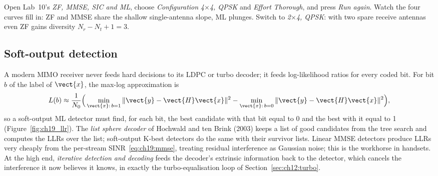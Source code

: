 \begin{tryit}
Open Lab~10's \emph{ZF, MMSE, SIC and ML}, choose \emph{Configuration} \emph{4$\times$4, QPSK} and
\emph{Effort} \emph{Thorough}, and press \emph{Run again}. Watch the four curves fill in: ZF and MMSE
share the shallow single-antenna slope, ML plunges. Switch to \emph{2$\times$4, QPSK}: with two spare
receive antennas even ZF gains diversity $N_r-N_t+1=3$.
\end{tryit}

\subsection{Soft-output detection}

A modern MIMO receiver never feeds hard decisions to its LDPC or turbo decoder; it feeds
log-likelihood ratios for every coded bit. For bit $b$ of the label of $\vect{x}$, the max-log
approximation is
\begin{equation}
L(b)\approx\frac{1}{N_0}\Big(\min_{\vect{x}:\,b=1}\|\vect{y}-\vect{H}\vect{x}\|^2-\min_{\vect{x}:\,b=0}\|\vect{y}-\vect{H}\vect{x}\|^2\Big),
\end{equation}
so a soft-output ML detector must find, for each bit, the best candidate with that bit equal to 0
and the best with it equal to 1 (Figure~\ref{fig:ch19_llr}). The \emph{list sphere decoder} of Hochwald and ten Brink (2003)
keeps a list of good candidates from the tree search and computes the LLRs over the list;
soft-output K-best detectors do the same with their survivor lists. Linear MMSE detectors produce
LLRs very cheaply from the per-stream SINR~\eqref{eq:ch19:mmse}, treating residual interference as
Gaussian noise; this is the workhorse in handsets. At the high end, \emph{iterative detection and
decoding} feeds the decoder's extrinsic information back to the detector, which cancels the
interference it now believes it knows, in exactly the turbo-equalisation loop of
Section~\ref{sec:ch12:turbo}.



